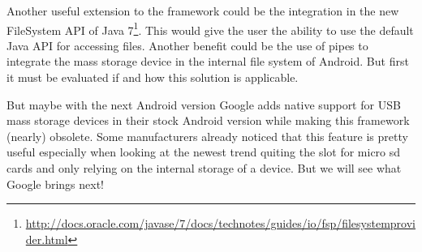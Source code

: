 Another useful extension to the framework could be the integration in the new FileSystem API of Java 7\footnote{\url{http://docs.oracle.com/javase/7/docs/technotes/guides/io/fsp/filesystemprovider.html}}. This would give the user the ability to use the default Java API for accessing files. Another benefit could be the use of pipes to integrate the mass storage device in the internal file system of Android. But first it must be evaluated if and how this solution is applicable.

But maybe with the next Android version Google adds native support for USB mass storage devices in their stock Android version while making this framework (nearly) obsolete. Some manufacturers already noticed that this feature is pretty useful especially when looking at the newest trend quiting the slot for micro sd cards and only relying on the internal storage of a device. But we will see what Google brings next!